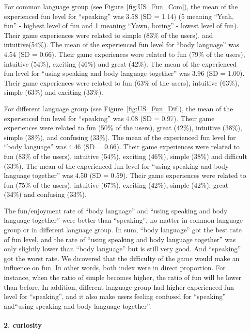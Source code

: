 For common language group (see Figure~\ref{fig:US_Fun_Com}), the mean of the experienced fun level for ``speaking'' was 3.58 (SD = 1.14) (5 meaning ``Yeah, fun'' - highest level of fun and 1 meaning ``Yawn, boring'' - lowest level of fun). Their game experiences were related to simple (83\% of the users), and intuitive(54\%). The mean of the experienced fun level for ``body language'' was 4.54 (SD = 0.66). Their game experiences were related to fun (79\% of the users), intuitive (54\%), exciting (46\%) and great (42\%). The mean of the experienced fun level for ``using speaking and body language together'' was 3.96 (SD = 1.00). Their game experiences were related to fun (63\% of the users), intuitive (63\%), simple (63\%) and exciting (33\%). 

For different language group (see Figure~\ref{fig:US_Fun_Dif}), the mean of the experienced fun level for ``speaking'' was 4.08 (SD = 0.97). Their game experiences were related to fun (50\% of the users), great (42\%), intuitive (38\%), simple (38\%), and confusing (33\%). The mean of the experienced fun level for ``body language'' was 4.46 (SD = 0.66). Their game experiences were related to fun (83\% of the users), intuitive (54\%), exciting (46\%), simple (38\%) and difficult (33\%). The mean of the experienced fun level for ``using speaking and body language together'' was 4.50 (SD = 0.59). Their game experiences were related to fun (75\% of the users), intuitive (67\%), exciting (42\%), simple (42\%), great (34\%) and confusing (33\%).

The fun/enjoyment rate of ``body language'' and ``using speaking and body language together'' were better than ``speaking'', no matter in common language group or in different language group. In sum, ``body language'' got the best rate of fun level, and the rate of ``using speaking and body language together'' was only slightly lower than ``body language'' but is still very good. And ``speaking'' got the worst rate. We dicovered that the difficulty of the game would make an influence on fun. In other words, both index were in direct proportion. For instance, when the ratio of simple becomes higher, the ratio of fun will be lower than before. In addition, different language group had higher experienced fun level for ``speaking'', and it also make users feeling confused for ``speaking'' and``using speaking and body language together''.



\paragraph{2. curiosity}

